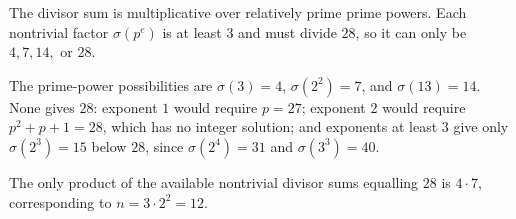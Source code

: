 The divisor sum is multiplicative over relatively prime prime powers. Each nontrivial factor $\sigma(p^e)$ is at least $3$ and must divide $28$, so it can only be $4,7,14,$ or $28$.

The prime-power possibilities are $\sigma(3)=4$, $\sigma(2^2)=7$, and $\sigma(13)=14$. None gives $28$: exponent $1$ would require $p=27$; exponent $2$ would require $p^2+p+1=28$, which has no integer solution; and exponents at least $3$ give only $\sigma(2^3)=15$ below $28$, since $\sigma(2^4)=31$ and $\sigma(3^3)=40$.

The only product of the available nontrivial divisor sums equalling $28$ is $4\cdot7$, corresponding to $n=3\cdot2^2=\boxed{12}$.

